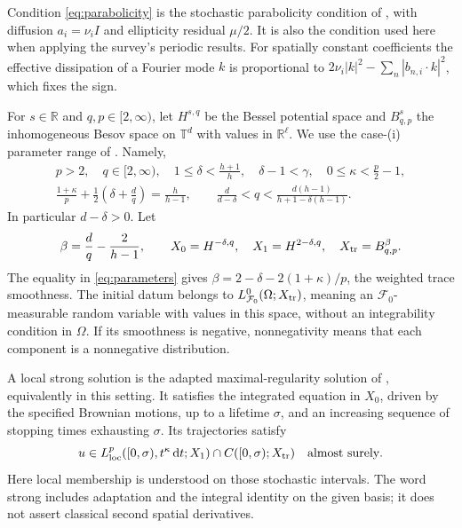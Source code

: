 \documentclass[11pt]{amsart}
\theoremstyle{definition}
\newcommand{\T}{\mathbb T}
\newcommand{\R}{\mathbb R}
\newcommand{\F}{\mathcal F}
\newcommand{\dd}{\,\mathrm d}
\numberwithin{equation}{section}
\begin{document}
Condition \eqref{eq:parabolicity} is the stochastic parabolicity condition
of \cite[Assumption~2.1(3), p.~7]{AVlocal}, with diffusion
$a_i=\nu_i I$ and ellipticity residual $\mu/2$. It is also the condition
used here when applying the survey's periodic results. For spatially
constant coefficients the effective dissipation of a Fourier mode $k$
is proportional to
$2\nu_i|k|^2-\sum_n|b_{n,i}\cdot k|^2$, which fixes the sign.

For $s\in\R$ and $q,p\in[2,\infty)$, let $H^{s,q}$ be the Bessel
potential space and $B^s_{q,p}$ the inhomogeneous Besov space on $\T^d$
with values in $\R^\ell$. We use the case-(i) parameter range of
\cite[Assumption~8.4]{AVsurvey}. Namely,
\begin{equation}\label{eq:parameters}
\begin{gathered}
p>2,\quad q\in[2,\infty),\quad
1\leq\delta<\frac{h+1}{h},\quad \delta-1<\gamma,
\quad 0\leq\kappa<\frac p2-1,\\
\frac{1+\kappa}{p}+\frac12\left(\delta+\frac dq\right)
 =\frac h{h-1},\qquad
\frac d{d-\delta}<q<\frac{d(h-1)}{h+1-\delta(h-1)}.
\end{gathered}
\end{equation}
In particular $d-\delta>0$. Let
\begin{equation}\label{eq:trace}
\beta=\frac dq-\frac2{h-1},\qquad
X_0=H^{-\delta,q},\quad X_1=H^{2-\delta,q},\quad
X_{\rm tr}=B^\beta_{q,p}.
\end{equation}
The equality in \eqref{eq:parameters} gives
$\beta=2-\delta-2(1+\kappa)/p$, the weighted trace smoothness.
The initial datum belongs to
$L^0_{\F_0}(\Omega;X_{\rm tr})$, meaning an $\F_0$-measurable random
variable with values in this space, without an integrability condition
in $\Omega$. If its smoothness is negative, nonnegativity means that
each component is a nonnegative distribution.

A local strong solution is the adapted maximal-regularity solution of
\cite[Definitions~4.5--4.6, pp.~41--42]{AVsurvey}, equivalently
\cite[Definition~2.3, p.~8]{AVlocal} in this setting. It satisfies the
integrated equation in $X_0$, driven by the specified Brownian motions,
up to a lifetime $\sigma$, and an increasing sequence of stopping times
exhausting $\sigma$. Its trajectories satisfy
\begin{equation}\label{eq:local-class}
u\in L^p_{\rm loc}([0,\sigma),t^\kappa\dd t;X_1)
 \cap C([0,\sigma);X_{\rm tr})\quad\hbox{almost surely}.
\end{equation}
Here local membership is understood on those stochastic intervals.
The word strong includes adaptation and the integral identity on the
given basis; it does not assert classical second spatial derivatives.
\end{document}
